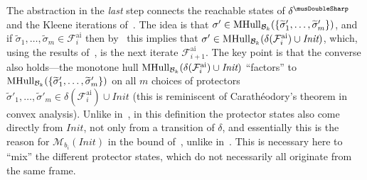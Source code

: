 \documentclass[acmsmall,screen]{acmart}
\newcommand{\Init}{{\textit{Init}}}
\newcommand{\tr}{\delta}
\newcommand{\Frameai}{\mathcal{F}^{\text{ai}}}
\newcommand{\set}[1]{\{{#1}\}}
\newcommand{\bkwrch}[1]{\mathcal{B}_{#1}}
\newcommand{\monox}[2]{\mathcal{M}_{#2}({#1})}
\newcommand{\mhull}[2]{{\rm MHull}_{#2}({#1})}
\newcommand{\absr}[1]{{#1}^{\musDoubleSharp}}
\newcommand{\bkcube}{b}
\begin{document}
%
%
The abstraction in the \emph{last} step connects the reachable states of $\absr{\tr}$ and the Kleene iterations of~.
The idea is that $\sigma' \in \mhull{\set{\widetilde{\sigma}'_1,\ldots,\widetilde{\sigma}'_m}}{\bkwrch{k}}$, and if $\widetilde{\sigma}_1,\ldots,\widetilde{\sigma}_m \in \Frameai_i$ then by~ this implies that $\sigma' \in \mhull{{\tr}({\Frameai_i}) \cup \Init}{\bkwrch{k}}$, which, using the results of~, is the next iterate $\Frameai_{i+1}$.
%
The key point is that the converse also holds---the monotone hull $\mhull{{\tr}({\Frameai_i}) \cup \Init}{\bkwrch{k}}$ ``factors'' to $\mhull{\set{\widetilde{\sigma}'_1,\ldots,\widetilde{\sigma}'_m}}{\bkwrch{k}}$ on all $m$ choices of protectors
%
$\widetilde{\sigma}'_1,\ldots,\widetilde{\sigma}'_m \in {\tr}({\Frameai_i}) \cup \Init$ (this is reminiscent of Carath\'{e}odory's theorem in convex analysis).
%
Unlike in~, in this definition the protector states also come directly from $\Init$, not only from a transition of $\tr$, and essentially this is the reason for $\monox{\Init}{\bkcube_i}$ in the bound of~, unlike in~. This is necessary here to ``mix'' the different protector states, which do not necessarily all originate from the same frame.
%
%
%
%
%
\end{document}

